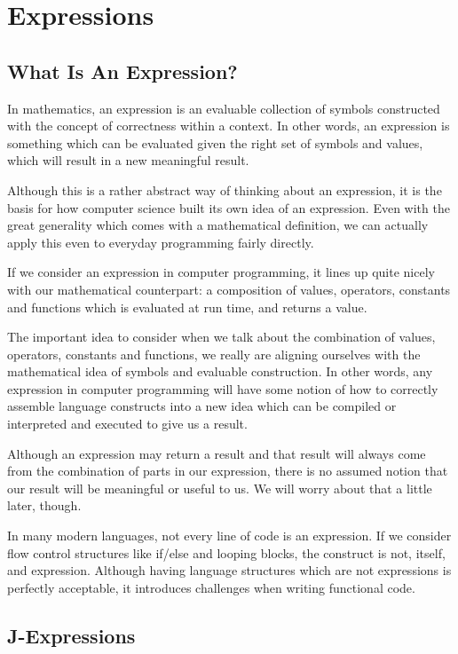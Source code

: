 \documentclass[a4paper,12pt,twoside]{book}
\begin{document}
\chapter{Expressions}
\section{What Is An Expression?}
 
 In mathematics, an expression is an evaluable collection of symbols constructed with the concept of correctness within a context.  In other words, an expression is something which can be evaluated given the right set of symbols and values, which will result in a new meaningful result.
 
 Although this is a rather abstract way of thinking about an expression, it is the basis for how computer science built its own idea of an expression.  Even with the great generality which comes with a mathematical definition, we can actually apply this even to everyday programming fairly directly.
 
 If we consider an expression in computer programming, it lines up quite nicely with our mathematical counterpart: a composition of values, operators, constants and functions which is evaluated at run time, and returns a value.
 
 The important idea to consider when we talk about the combination of values, operators, constants and functions, we really are aligning ourselves with the mathematical idea of symbols and evaluable construction.  In other words, any expression in computer programming will have some notion of how to correctly assemble language constructs into a new idea which can be compiled or interpreted and executed to give us a result.
 
 Although an expression may return a result and that result will always come from the combination of parts in our expression, there is no assumed notion that our result will be meaningful or useful to us.  We will worry about that a little later, though.
 
 In many modern languages, not every line of code is an expression.  If we consider flow control structures like if/else and looping blocks, the construct is not, itself, and expression.  Although having language structures which are not expressions is perfectly acceptable, it introduces challenges when writing functional code.
 
\section{J-Expressions}
 
\end{document}

